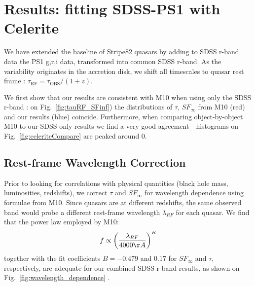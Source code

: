 \documentclass[twocolumn]{aastex62}
\begin{document}
\begin{figure*}
\caption{Comparison of retrieved parameters in relation to input parameters, shown as Fig.18 in \citet{macleod2011} }
\label{fig:simLCresults2}
\end{figure*} 


%
%
%
%
%
%
%
%

\section{Results: fitting SDSS-PS1 with Celerite}\label{sec:results}

We have extended the baseline of Stripe82 quasars by adding to SDSS r-band data the  PS1 g,r,i data, transformed into common SDSS r-band. As the variability originates in the accretion disk, we shift all timescales to quasar rest frame : $\tau_{\mathrm{RF}} = \tau_{\mathrm{OBS}} / (1+z)$. 


\begin{figure*}
\caption{Comparing the rest-frame timescales $\tau$, and asymptotic variability amplitudes $SF_{\infty}$, for M10 SDSS r-band,  and combined SDSS and PS1 data.  }
\label{fig:tauRF_SFinf}
\end{figure*} 


We first show that our results are consistent with M10 when using only the SDSS r-band : on Fig.~\ref{fig:tauRF_SFinf}) the distributions of $\tau$, $SF_{\infty}$ from M10 (red) and our results (blue) coincide. Furthermore, when comparing object-by-object M10 to our SDSS-only results we find a very good agreement - histograms on Fig.~\ref{fig:celeriteCompare} are peaked around 0. 


\begin{figure*}
\caption{Plot comparing results for SDSS r-band fitting of  M10 ($\sigma_{m}, \tau_{m}$), and current results for SDSS r-band using Celerite ($\sigma_{fit}, \tau_{fit}$). }
\label{fig:celeriteCompare}
\end{figure*} 


\subsection{Rest-frame Wavelength Correction}

Prior to looking for correlations with physical quantities (black hole mass, luminosities, redshifts), we correct $\tau$ and $SF_{\infty}$ for wavelength dependence using formulae from M10. Since quasars are at different redshifts, the same observed band would probe a different rest-frame wavelength $\lambda_{RF}$ for each quasar. We find that the power law employed by M10:
\begin{equation}
f \propto \left( \frac{\lambda_{RF}}{4000 \AA} \right)^{B}
\end{equation}
together with the fit coefficients $B=-0.479$ and $0.17$ for $SF_{\infty}$ and $\tau$, respectively, are adequate for our combined SDSS r-band results, as shown on Fig.~\ref{fig:wavelength_dependence} . 
\end{document}

